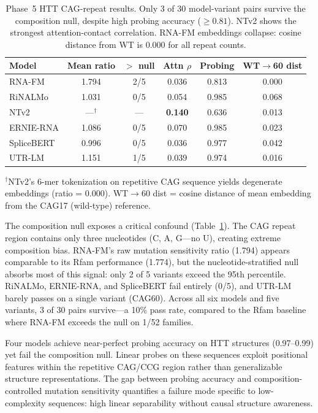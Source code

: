 \documentclass[11pt]{article}
\begin{document}
\begin{table}[t]
\centering
\caption{Phase~5 HTT CAG-repeat results.  Only 3 of 30
  model-variant pairs survive the composition null, despite
  high probing accuracy ($\geq 0.81$).  NTv2 shows the strongest
  attention-contact correlation.  RNA-FM embeddings
  collapse: cosine distance from WT is 0.000 for all
  repeat counts.}
\label{tab:phase5}
\begin{tabular}{@{}lccccc@{}}
\toprule
\textbf{Model} & \textbf{Mean ratio} & \textbf{$>$ null} &
  \textbf{Attn $\rho$} & \textbf{Probing} &
  \textbf{WT$\to$60 dist} \\
\midrule
RNA-FM     & 1.794 & 2/5  & 0.036 & 0.813 & 0.000 \\
RiNALMo    & 1.031 & 0/5  & 0.054 & 0.985 & 0.068 \\
NTv2       & ---$^\dagger$ & ---   & \textbf{0.140} & 0.636 & 0.013 \\
ERNIE-RNA  & 1.086 & 0/5  & 0.070 & 0.985 & 0.023 \\
SpliceBERT & 0.996 & 0/5  & 0.036 & 0.977 & 0.042 \\
UTR-LM     & 1.151 & 1/5  & 0.039 & 0.974 & 0.016 \\
\bottomrule
\end{tabular}
\medskip

\small $^\dagger$NTv2's 6-mer tokenization on repetitive CAG
sequence yields degenerate embeddings (ratio = 0.000).
WT$\to$60 dist = cosine distance of mean embedding from the
CAG17 (wild-type) reference.
\end{table}

The composition null exposes a critical confound
(Table~\ref{tab:phase5}).  The CAG repeat region contains only
three nucleotides (C, A, G---no U), creating extreme composition
bias.  RNA-FM's raw mutation sensitivity ratio (1.794) appears
comparable to its Rfam performance (1.774), but the
nucleotide-stratified null absorbs most of this signal: only 2 of 5
variants exceed the 95th percentile.  RiNALMo, ERNIE-RNA, and
SpliceBERT fail entirely (0/5), and UTR-LM barely passes on a
single variant (CAG60).  Across all six models and five variants,
3 of 30 pairs survive---a 10\% pass rate, compared to the
Rfam baseline where RNA-FM exceeds the null on 1/52 families.

Four models achieve near-perfect probing accuracy on HTT structures
(0.97--0.99) yet fail the composition null.  Linear probes
on these sequences exploit positional features within the repetitive
CAG/CCG region rather than generalizable structure representations.
The gap between probing accuracy and composition-controlled
mutation sensitivity quantifies a failure mode specific to
low-complexity sequences: high linear separability without causal
structure awareness.
\end{document}
